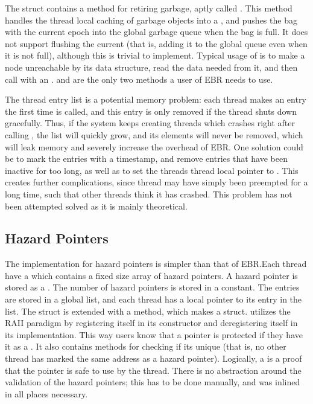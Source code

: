 \documentclass[b5paper]{report}
\begin{document}
The  struct contains a method for retiring garbage, aptly called
. This method handles the thread local caching of garbage
objects into a , and pushes the bag with the current epoch into the
global garbage queue when the bag is full. It does not support flushing the
current  (that is, adding it to the global queue even when it is not
full), although this is trivial to implement. Typical usage of
 is to make a node unreachable by its data structure, read
the data needed from it, and then call  with an
.   and  are the only two
methods a user of EBR needs to use.

The thread entry list is a potential memory problem: each thread makes an entry
the first time  is called, and this entry is only removed if the
thread shuts down gracefully. Thus, if the system keeps creating threads which
crashes right after calling , the list will quickly grow, and its
elements will never be removed, which will leak memory and severely increase the
overhead of EBR\@. One solution could be to mark the entries with a timestamp, and
remove entries that have been inactive for too long, as well as to set the
threads thread local pointer to . This creates further complications,
since thread may have simply been preempted for a long time, such that other
threads think it has crashed. This problem has not been attempted solved as it
is mainly theoretical.\label{sec:thread-cleanup}

\subsection{Hazard Pointers}

The implementation for hazard pointers is simpler than that of EBR.\@ Each
thread have a  which contains a fixed size array of hazard
pointers. A hazard pointer is stored as a .  The number of
hazard pointers is stored in a constant. The entries are stored in a global
list, and each thread has a local pointer to its entry in the list. The
 struct is extended with a  method, which makes a
 struct.   utilizes the RAII paradigm by
registering itself in its constructor and deregistering itself in its
 implementation. This way users know that a pointer is protected if
they have it as a . It also contains methods for checking if its
unique (that is, no other thread has marked the same address as a hazard
pointer).  Logically, a  is a proof that the pointer is safe to
use by the thread. There is no abstraction around the validation of the hazard
pointers; this has to be done manually, and was inlined in all places necessary.
\end{document}
